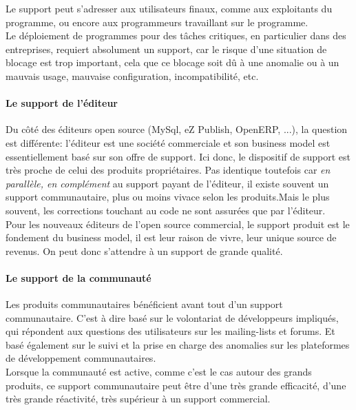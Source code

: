 				Le support peut s'adresser aux utilisateurs finaux, comme aux exploitants du programme, ou encore aux programmeurs travaillant sur le programme.\\
				
				Le déploiement de programmes pour des tâches critiques, en particulier dans des entreprises, requiert absolument un support, car le risque d'une situation de blocage est trop important, cela que ce blocage soit dû à une anomalie ou à un mauvais usage, mauvaise configuration, incompatibilité, etc.

				\paragraph{Le support de l'éditeur\\}

				Du côté des éditeurs open source (MySql, eZ Publish, OpenERP, ...), la question est différente: l'éditeur est une société commerciale et son business model est essentiellement basé sur son offre de support. Ici donc, le dispositif de support est très proche de celui des produits propriétaires. Pas identique toutefois car \textit{en parallèle, en complément} au support payant de l'éditeur, il existe souvent un support communautaire, plus ou moins vivace selon les produits.Mais le plus souvent, les corrections touchant au code ne sont assurées que par l'éditeur.\\

				Pour les nouveaux éditeurs de l'open source commercial, le support produit est le fondement du business model, il est leur raison de vivre, leur unique source de revenus. On peut donc s'attendre à un support de grande qualité.

				\paragraph{Le support de la communauté\\}

				Les produits communautaires bénéficient avant tout d'un support communautaire. C'est à dire basé sur le volontariat de développeurs impliqués, qui répondent aux questions des utilisateurs sur les mailing-lists et forums. Et basé également sur le suivi et la prise en charge des anomalies sur les plateformes de développement communautaires.\\

				Lorsque la communauté est active, comme c'est le cas autour des grands produits, ce support communautaire peut être d'une très grande efficacité, d'une très grande réactivité, très supérieur à un support commercial.\\

